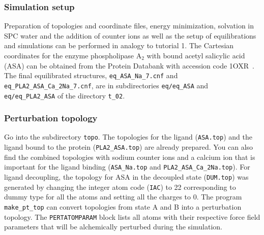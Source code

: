 \subsubsection{Simulation setup}
Preparation of topologies and coordinate files, energy minimization, solvation in SPC water and the addition of counter ions as well as the setup of equilibrations and simulations can be performed in analogy to tutorial 1. The Cartesian coordinates for the enzyme phospholipase A$_2$ with bound acetyl salicylic acid (ASA) can be obtained from the Protein Databank with accession code 1OXR~\cite{Singh2005}.
The final equilibrated structures, \texttt{eq\_ASA\_Na\_7.cnf} and \texttt{eq\_PLA2\_ASA\_Ca\_2Na\_7.cnf}, are in subdirectories \texttt{eq/eq\_ASA} and \texttt{eq/eq\_PLA2\_ASA} of the directory \texttt{t\_02}. 

\subsubsection{Perturbation topology}
Go into the subdirectory \texttt{topo}. The topologies for the ligand (\texttt{ASA.top}) and the ligand bound to the protein (\texttt{PLA2\_ASA.top}) are already prepared. You can also find the combined topologies with sodium counter ions and a calcium ion that is important for the ligand binding (\texttt{ASA\_Na.top} and \texttt{PLA2\_ASA\_Ca\_2Na.top}). For ligand decoupling, the topology for ASA in the decoupled state (\texttt{DUM.top}) was generated by changing the integer atom code (\texttt{IAC}) to 22 corresponding to dummy type for all the atoms and setting all the charges to 0. The program \texttt{make\_pt\_top} can convert topologies from state A and B into a perturbation topology. The \texttt{PERTATOMPARAM} block lists all atoms with their respective force field parameters that will be alchemically perturbed during the simulation. 

